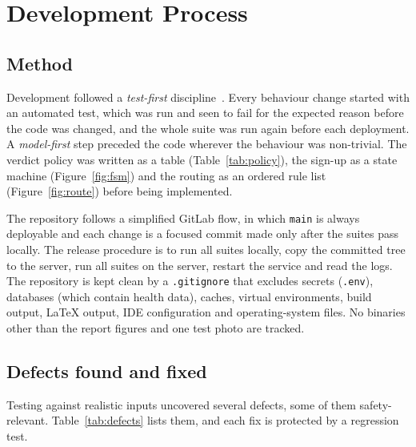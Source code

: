 \documentclass[11pt,a4paper]{article}
\begin{document}
\section{Development Process}\label{sec:process}

\subsection{Method}

Development followed a \emph{test-first} discipline~\cite{beck2002}. Every behaviour change started
with an automated test, which was run and seen to fail for the expected reason before the code was
changed, and the whole suite was run again before each deployment. A \emph{model-first} step preceded
the code wherever the behaviour was non-trivial. The verdict policy was written as a table
(Table~\ref{tab:policy}), the sign-up as a state machine (Figure~\ref{fig:fsm}) and the routing as an
ordered rule list (Figure~\ref{fig:route}) before being implemented.

The repository follows a simplified GitLab flow, in which \texttt{main} is always deployable and each
change is a focused commit made only after the suites pass locally. The release procedure is to run
all suites locally, copy the committed tree to the server, run all suites on the server, restart the
service and read the logs. The repository is kept clean by a \texttt{.gitignore} that excludes secrets
(\texttt{.env}), databases (which contain health data), caches, virtual environments, build output,
LaTeX output, IDE configuration and operating-system files. No binaries other than the report figures
and one test photo are tracked.

\subsection{Defects found and fixed}\label{sec:defects}

Testing against realistic inputs uncovered several defects, some of them safety-relevant.
Table~\ref{tab:defects} lists them, and each fix is protected by a regression test.
\end{document}
